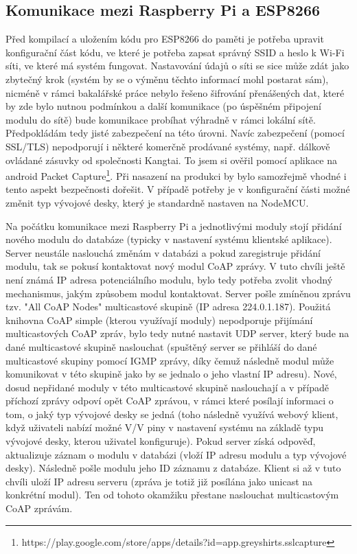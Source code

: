 \subsection*{Komunikace mezi Raspberry Pi a ESP8266}
Před kompilací a uložením kódu pro ESP8266 do paměti je potřeba upravit konfigurační část kódu, ve které je potřeba zapsat správný SSID a heslo k Wi-Fi síti, ve které má systém fungovat. Nastavování údajů o síti se sice může zdát jako zbytečný krok (systém by se o výměnu těchto informací mohl postarat sám), nicméně v rámci bakalářské práce nebylo řešeno šifrování přenášených dat, které by zde bylo nutnou podmínkou a další komunikace (po úspěšném připojení modulu do sítě) bude komunikace probíhat výhradně v rámci lokální sítě. Předpokládám tedy jisté zabezpečení na této úrovni. Navíc zabezpečení (pomocí SSL/TLS) nepodporují i některé komerčně prodávané systémy, např. dálkově ovládané zásuvky od společnosti Kangtai. To jsem si ověřil pomocí aplikace na android Packet Capture\footnote{https://play.google.com/store/apps/details?id=app.greyshirts.sslcapture}. Při nasazení na produkci by bylo samozřejmě vhodné i tento aspekt bezpečnosti dořešit. V případě potřeby je v konfigurační části možné změnit typ vývojové desky, který je standardně nastaven na NodeMCU.


Na počátku komunikace mezi Raspberry Pi a jednotlivými moduly stojí přidání nového modulu do databáze (typicky v nastavení systému klientské aplikace). Server neustále naslouchá změnám v databázi a pokud zaregistruje přidání modulu, tak se pokusí kontaktovat nový modul CoAP zprávy. V tuto chvíli ještě není známá IP adresa potenciálního modulu, bylo tedy potřeba zvolit vhodný mechanismus, jakým způsobem modul kontaktovat. Server pošle zmíněnou zprávu tzv. "All CoAP Nodes" multicastové skupině (IP adresa 224.0.1.187). Použitá knihovna CoAP simple (kterou využívají moduly) nepodporuje přijímání multicastových CoAP zpráv, bylo tedy nutné nastavit UDP server, který bude na dané multicastové skupině naslouchat (spuštěný server se přihláší do dané multicastové skupiny pomocí IGMP zprávy, díky čemuž následně modul může komunikovat v této skupině jako by se jednalo o jeho vlastní IP adresu). Nové, dosud nepřidané moduly v této multicastové skupině naslouchají a v případě příchozí zprávy odpoví opět CoAP zprávou, v rámci které posílají informaci o tom, o jaký typ vývojové desky se jedná (toho následně využívá webový klient, když uživateli nabízí možné V/V piny v nastavení systému na základě typu vývojové desky, kterou uživatel konfiguruje). 
Pokud server získá odpověď, aktualizuje záznam o modulu v databázi (vloží IP adresu modulu a typ vývojové desky). Následně pošle modulu jeho ID záznamu z databáze. Klient si až v tuto chvíli uloží IP adresu serveru (zpráva je totiž již posílána jako unicast na konkrétní modul). Ten od tohoto okamžiku přestane naslouchat multicastovým CoAP zprávám.

